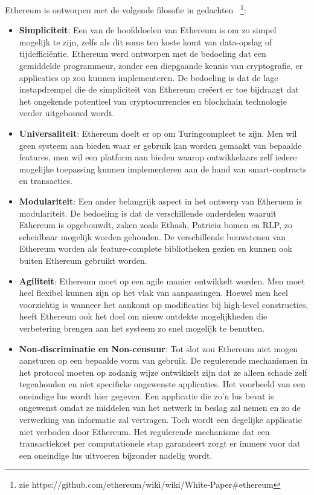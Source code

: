 			Ethereum is ontworpen met de volgende filosofie in gedachten ~\autocite{Buterin2014}\footnote{zie https://github.com/ethereum/wiki/wiki/White-Paper\#ethereum}:
			\begin{itemize}
				\setlength\itemsep{1em}
				\item \textbf{Simpliciteit}: 
				Een van de hoofddoelen van Ethereum is om zo simpel mogelijk te zijn, zelfs als dit soms ten koste komt van data-opslag of tijdefficiëntie. Ethereum werd ontworpen met de bedoeling dat een gemiddelde programmeur, zonder een diepgaande kennis van cryptografie, er applicaties op zou kunnen implementeren. De bedoeling is dat de lage instapdrempel die de simpliciteit van Ethereum creëert er toe bijdraagt dat het ongekende potentieel van cryptocurrencies en blockchain technologie verder uitgebouwd wordt.
				\item \textbf{Universaliteit}: Ethereum doelt er op om Turingcompleet te zijn. Men wil  geen systeem aan bieden waar er gebruik kan worden gemaakt van bepaalde features, men wil een platform aan bieden waarop ontwikkelaars zelf iedere mogelijke toepassing kunnen implementeren aan de hand van smart-contracts en transacties.
				\item \textbf{Modulariteit}: 
				Een ander belangrijk aspect in het ontwerp van Etheruem is modulariteit. De bedoeling is dat de verschillende onderdelen waaruit Ethereum is opgebouwdt, zaken zoals Ethash, Patricia bomen en RLP, zo scheidbaar mogelijk worden gehouden. De verschillende bouwstenen van Ethereum worden als feature-complete bibliotheken gezien en kunnen ook buiten Ethereum gebruikt worden.
				\item \textbf{Agiliteit}: 
				Ethereum moet op een agile manier ontwikkelt worden. Men moet heel flexibel kunnen zijn op het vlak van aanpassingen. Hoewel men heel voorzichtig is wanneer het aankomt op modificaties bij high-level constructies, heeft Ethereum ook het doel om nieuw ontdekte mogelijkheden die verbetering brengen aan het systeem zo snel mogelijk te benutten.
				\item \textbf{Non-discriminatie en Non-censuur}: 
				Tot slot zou Ethereum niet mogen aansturen op een bepaalde vorm van gebruik. De regulerende mechanismen in het protocol moeten op zodanig wijze ontwikkelt zijn dat ze alleen schade zelf tegenhouden en niet specifieke ongewenste applicaties. Het voorbeeld van een oneindige lus wordt hier gegeven. Een applicatie die zo'n lus bevat is  ongewenst omdat ze middelen van het netwerk in beslag zal nemen en zo de verwerking van informatie zal vertragen. Toch wordt een degelijke applicatie niet verboden door Ethereum. Het regulerende mechanisme dat een transactiekost per computationele stap garandeert zorgt er immers voor dat een oneindige lus uitvoeren bijzonder nadelig wordt.
			\end{itemize}
